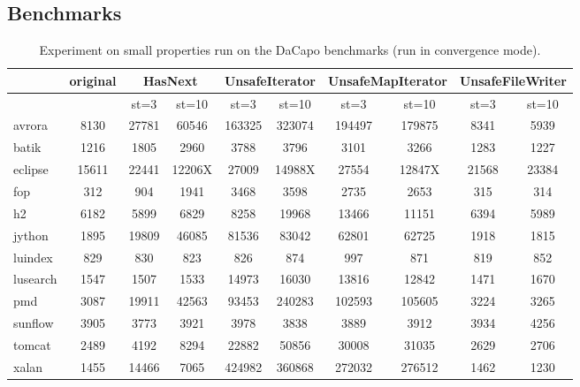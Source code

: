 \documentclass[9pt, preprint]{sigplanconf} %
\theoremstyle{definition}
\theoremstyle{remark}
\begin{document}
\subsection{Benchmarks} %
\begin{table*}[t]
\begin{center}
\begin{tabular}{|l|c||c|c||c|c||c|c||c|c|} \hline
  & original  & \multicolumn{2}{|c|}{HasNext} & \multicolumn{2}{c|}{UnsafeIterator} &\multicolumn{2}{|c|}{UnsafeMapIterator} & \multicolumn{2}{|c|}{UnsafeFileWriter}
  \\ \hline
  & & st=3 & st=10 & st=3 & st=10 & st=3 & st=10 & st=3 & st=10 
  \\ \hline \hline
 avrora  & 8130 & 27781 & 60546 & 163325 & 323074 & 194497  & 179875 & 8341 & 5939 
 \\ \hline
 batik     &  1216  & 1805 &    2960 & 3788 &  3796  & 3101 &  3266 & 1283            &  1227 
 \\ \hline
eclipse   &  15611  &  22441 &  12206X & 27009 &  14988X & 27554 &  12847X & 21568 &  23384 
\\ \hline
fop    &   312   &  904 &  1941 & 3468  &  3598   & 2735 &   2653 & 315 &   314
\\ \hline
h2     &    6182  &  5899 &  6829   & 8258    & 19968  & 13466 & 11151   & 6394 &          5989  
\\ \hline
jython    &  1895  & 19809 &  46085 &  81536   & 83042  &  62801 &       62725    & 1918 &         1815 
\\ \hline
luindex     &  829   & 830 &   823    & 826 & 874  & 997  &   871      & 819 &         852 
\\ \hline
lusearch    &  1547  &  1507 &   1533 & 14973 &  16030    & 13816  &  12842    & 1471 & 1670 
\\ \hline
pmd        &   3087    & 19911 &42563  &  93453 &240283   & 102593 &       105605  & 3224 &           3265 
\\ \hline
sunflow    &  3905   & 3773 &  3921   &  3978 & 3838    & 3889 &        3912     & 3934 &         4256 
\\ \hline
tomcat     &   2489    & 4192 & 8294    & 22882 & 50856   & 30008 &        31035   & 2629 &          2706 
\\ \hline
xalan      &    1455   &  14466      & 7065 & 424982  & 360868 &  272032   & 276512 &  1462 & 1230 
\\ \hline  
\end{tabular}
\end{center}
\caption{Experiment on small properties run on the DaCapo benchmarks (run in convergence mode).}
\label{tab:javamop-experiments}
\end{table*}%
\end{document}

